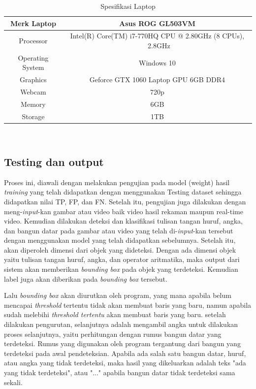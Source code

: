\begin{table}[H]
\centering
	\caption{Spesifikasi Laptop}
	\begin{tabular}{|c|c|}
		 \toprule
		 Merk Laptop & Asus ROG GL503VM \\
		 \midrule
		 Processor & Intel(R) Core(TM) i7-770HQ CPU @ 2.80GHz (8 CPUs), ~2.8GHz \\  
		 \midrule
		 Operating System & Windows 10  \\
		 \midrule
		 Graphics & Geforce GTX 1060 Laptop GPU 6GB DDR4 \\
		 \midrule
		 Webcam & 720p \\
		 \midrule
		 Memory & 6GB \\
		 \midrule
		 Storage & 1TB \\
		 \bottomrule
	\end{tabular}
	\label{tab:spesifikasilaptop}\
\end{table}

\subsection{Testing dan output}
Proses ini, diawali dengan melakukan pengujian pada model (weight) hasil \textit{training} yang telah didapatkan dengan menggunakan Testing dataset sehingga didapatkan nilai TP, FP, dan FN. Setelah itu, pengujian juga dilakukan dengan meng-\textit{input}-kan gambar atau video baik video hasil rekaman maupun real-time video. Kemudian dilakukan deteksi dan klasifikasi tulisan tangan huruf, angka, dan bangun datar pada gambar atau video yang telah di-\textit{input}-kan tersebut dengan menggunakan model yang telah didapatkan sebelumnya. Setelah itu, akan diperoleh dimensi dari objek yang dideteksi. Dengan ada dimensi objek yaitu tulisan tangan huruf, angka, dan operator aritmatika, maka output dari sistem akan memberikan \textit{bounding box} pada objek yang terdeteksi. Kemudian label juga akan diberikan pada \textit{bounding box} tersebut.

Lalu \textit{bounding box} akan diurutkan oleh program, yang mana apabila belum mencapai \textit{threshold} tertentu tidak akan membuat baris yang baru, namun apabila sudah melebihi \textit{threshold tertentu} akan membuat baris yang baru. setelah dilakukan pengurutan, selanjutnya adalah mengambil angka untuk dilakukan proses selanjutnya, yaitu perhitungan dengan rumus bangun datar yang terdeteksi. Rumus yang digunakan oleh program tergantung dari bangun yang terdeteksi pada awal pendeteksian. Apabila ada salah satu bangun datar, huruf, atau angka yang tidak terdeteksi, maka hasil yang dikeluarkan adalah teks "ada yang tidak terdeteksi", atau "..." apabila bangun datar tidak terdeteksi sama sekali.

